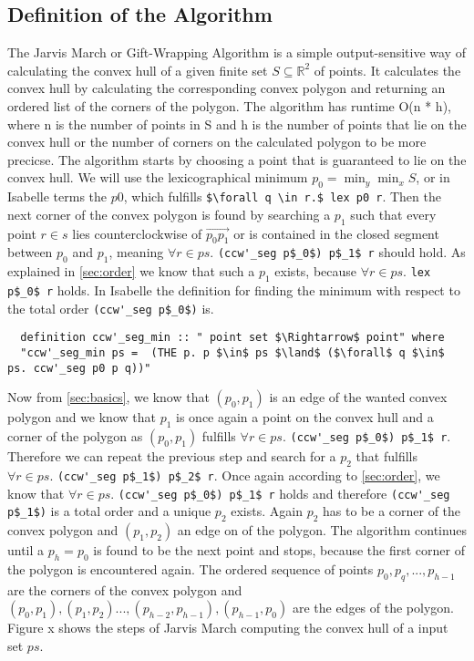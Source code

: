 \subsection{Definition of the Algorithm}
\label{jarvis:def}
The Jarvis March or Gift-Wrapping Algorithm is a simple output-sensitive way of calculating
the convex hull of a given finite set $S \subseteq \mathbb{R}^2$ of points. It calculates the
convex hull by calculating the corresponding convex polygon and returning
an ordered list of the corners of the polygon. The algorithm has runtime O(n * h), where n 
is the number of points in S and h is the number of points that lie on the convex hull or
the number of corners on the calculated polygon to be more precicse. 
The algorithm starts by choosing a point that is guaranteed to lie on the convex hull. 
We will use the lexicographical minimum $p_0 = \min_{y} \min_{x} S$, or in Isabelle terms
the $p0$, which fulfills \lstinline|$\forall q \in r.$ lex p0 r|.   Then the next corner of the convex polygon
is found by searching a $p_1$ such that every point $r \in s$ lies counterclockwise
of $\vec{p_0 p_1}$ or is contained in the closed segment between $p_0$ and $p_1$, meaning
$\forall r \in ps.$ \lstinline|(ccw'_seg p$_0$) p$_1$ r| should hold. 
As explained in \ref{sec:order} we know  that such a $p_1$ exists, because 
$\forall r \in ps.$ \lstinline|lex p$_0$ r| holds. In Isabelle the definition for
finding the minimum with respect to the total order \lstinline|(ccw'_seg p$_0$)| is.
\begin{lstlisting}
  definition ccw'_seg_min :: " point set $\Rightarrow$ point" where
  "ccw'_seg_min ps =  (THE p. p $\in$ ps $\land$ ($\forall$ q $\in$ ps. ccw'_seg p0 p q))"
\end{lstlisting}  
Now from \ref{sec:basics}, we 
know that $(p_0,p_1)$ is an edge of the wanted convex polygon and 
we know that $p_1$ is once again a point on
the convex hull and a corner of the polygon as $(p_0,p_1)$ fulfills $\forall r \in ps.$ \lstinline|(ccw'_seg p$_0$) p$_1$ r|. 
Therefore we can repeat the previous step
and search for a $p_2$ that fulfills $\forall r \in ps.$ \lstinline|(ccw'_seg p$_1$) p$_2$ r|. 
Once again according to \ref{sec:order}, we know that $\forall r \in ps.$ \lstinline|(ccw'_seg p$_0$) p$_1$ r|
holds and therefore \lstinline|(ccw'_seg p$_1$)| is a total order and a unique $p_2$ exists.
Again $p_2$ has to be a corner of the convex polygon and $(p_1,p_2)$ an edge on of the
polygon. The algorithm continues until a $p_h = p_0$ is found to be the next point and
stops, because the first corner of the polygon is encountered again. 
The ordered sequence of points $p_0,p_q, ... , p_{h-1}$ are the corners of the convex polygon 
and $(p_0,p_1),(p_1,p_2) ... ,(p_{h-2},p_{h-1}), (p_{h-1},p_0)$ are the edges of the polygon.
Figure x shows the steps of Jarvis March computing the convex hull of a input set $ps$.

